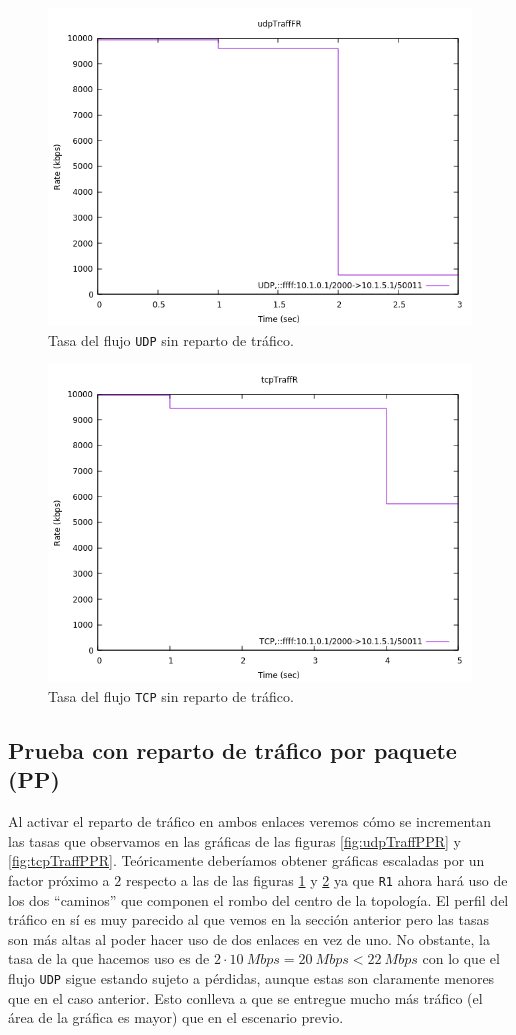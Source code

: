 \documentclass[11pt]{article}
\begin{document}
                \begin{figure}
                    \centering
                    \includegraphics[width=0.6\linewidth]{udpTraffNoBalancingR.png}
                    \caption{Tasa del flujo \texttt{UDP} sin reparto de tráfico.}
                    \label{fig:udpTraffNoBalancingR}
                \end{figure}

                \begin{figure}
                    \centering
                    \includegraphics[width=0.6\linewidth]{tcpTraffNoBalancingR.png}
                    \caption{Tasa del flujo \texttt{TCP} sin reparto de tráfico.}
                    \label{fig:tcpTraffNoBalancingR}
                \end{figure}

            \subsection{Prueba con reparto de tráfico por paquete (PP)}
                Al activar el reparto de tráfico en ambos enlaces veremos cómo se incrementan las tasas que observamos en las gráficas de las figuras \ref{fig:udpTraffPPR} y \ref{fig:tcpTraffPPR}. Teóricamente deberíamos obtener gráficas escaladas por un factor próximo a $2$ respecto a las de las figuras \ref{fig:udpTraffNoBalancingR} y \ref{fig:tcpTraffNoBalancingR} ya que \texttt{R1} ahora hará uso de los dos ``caminos'' que componen el rombo del centro de la topología. El perfil del tráfico en sí es muy parecido al que vemos en la sección anterior pero las tasas son más altas al poder hacer uso de dos enlaces en vez de uno. No obstante, la tasa de la que hacemos uso es de $2 \cdot 10\ Mbps = 20\ Mbps < 22\ Mbps$ con lo que el flujo \texttt{UDP} sigue estando sujeto a pérdidas, aunque estas son claramente menores que en el caso anterior. Esto conlleva a que se entregue mucho más tráfico (el área de la gráfica es mayor) que en el escenario previo.
\end{document}
